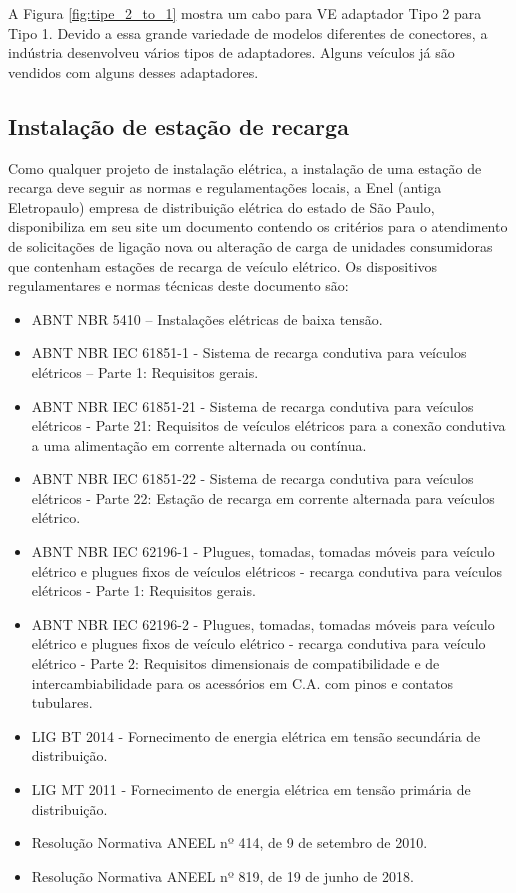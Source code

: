 A Figura \ref{fig:tipe_2_to_1} mostra um cabo para VE adaptador Tipo 2 para Tipo 1. Devido a essa grande variedade de modelos diferentes de conectores, a indústria desenvolveu vários tipos de adaptadores. Alguns veículos já são vendidos com alguns desses adaptadores.

\subsection{Instalação de estação de recarga}

Como qualquer projeto de instalação elétrica, a instalação de uma estação de recarga deve seguir as normas e regulamentações locais, a Enel (antiga Eletropaulo) empresa de distribuição elétrica do estado de São Paulo, disponibiliza em seu site  \cite{Eletropaulo} um documento contendo os critérios para o atendimento de solicitações de ligação nova ou alteração de carga de unidades consumidoras que contenham estações de recarga de veículo elétrico. Os dispositivos regulamentares e normas técnicas deste documento são:

\begin{itemize}
    \item ABNT NBR 5410 – Instalações elétricas de baixa tensão.
    \item ABNT NBR IEC 61851-1 - Sistema de recarga condutiva para veículos elétricos – Parte 1: Requisitos gerais.
    \item ABNT NBR IEC 61851-21 - Sistema de recarga condutiva para veículos elétricos - Parte 21: Requisitos de veículos elétricos para a conexão condutiva a uma alimentação em corrente alternada ou contínua.
    \item ABNT NBR IEC 61851-22 - Sistema de recarga condutiva para veículos elétricos - Parte 22: Estação de recarga em corrente alternada para veículos elétrico.
    \item ABNT NBR IEC 62196-1 - Plugues, tomadas, tomadas móveis para veículo elétrico e plugues fixos de veículos elétricos - recarga condutiva para veículos elétricos - Parte 1: Requisitos gerais.
    \item ABNT NBR IEC 62196-2 - Plugues, tomadas, tomadas móveis para veículo elétrico e plugues fixos de veículo elétrico - recarga condutiva para veículo elétrico - Parte 2: Requisitos dimensionais de compatibilidade e de intercambiabilidade para os acessórios em C.A. com pinos e contatos tubulares.
    \item LIG BT 2014 - Fornecimento de energia elétrica em tensão secundária de distribuição.
    \item LIG MT 2011 - Fornecimento de energia elétrica em tensão primária de distribuição.
    \item Resolução Normativa ANEEL nº 414, de 9 de setembro de 2010.
    \item Resolução Normativa ANEEL nº 819, de 19 de junho de 2018.
\end{itemize}

